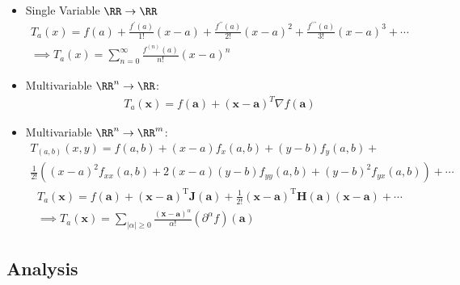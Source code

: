 \begin{itemize}
  \begin{itemize}
  \tightlist
  \item
    Single Variable \(\RR \to \RR\)
    \begin{align*}
      T_a(x) = f ( a ) + \frac { f ^ { \prime } ( a ) } { 1 ! } ( x - a ) + \frac { f ^ { \prime \prime } ( a ) } { 2 ! } ( x - a ) ^ { 2 } + \frac { f ^ { \prime \prime \prime } ( a ) } { 3 ! } ( x - a ) ^ { 3 } + \cdots \\ \implies T_a(x) = \sum _ { n = 0 } ^ { \infty } \frac { f ^ { ( n ) } ( a ) } { n ! } ( x - a ) ^ { n }
      \end{align*}
  \item
    Multivariable \(\RR^n \to \RR\):
    \begin{align*}
      T_a(\mathbf x) = f(\mathbf a) + (\mathbf x - \mathbf a)^T\nabla f(\mathbf a)
      \end{align*}
  \item
    Multivariable \(\RR^n \to \RR^m\):
    \begin{align*}
      T_{(a,b)} ( x , y ) = f ( a , b ) + ( x - a ) f _ { x } ( a , b ) + ( y - b ) f _ { y } ( a , b ) + \\ \frac { 1 } { 2 ! } \left( ( x - a ) ^ { 2 } f _ { x x } ( a , b ) + 2 ( x - a ) ( y - b ) f _ { y y  } ( a , b ) + ( y - b ) ^ { 2 } f _ { y x } ( a , b ) \right) + \cdots
      \end{align*}
    \begin{align*}
      T_a ( \mathbf { x } ) = f ( \mathbf { a } ) + ( \mathbf { x } - \mathbf { a } ) ^ { \mathrm { T } } \mathbf{J} ( \mathbf { a } ) + \frac { 1 } { 2 ! } ( \mathbf { x } - \mathbf { a } ) ^ { \mathrm { T } } \mathbf{H} ( \mathbf { a } ) ( \mathbf { x } - \mathbf { a } ) + \cdots \\
      \implies T_a ( \mathbf { x } ) = \sum _ { | \alpha | \geq 0 } \frac { ( \mathbf { x } - \mathbf { a } ) ^ { \alpha } } { \alpha ! } \left( \partial ^ { \alpha } f \right) ( \mathbf { a } )
      \end{align*}
  \end{itemize}
\end{itemize}

\hypertarget{analysis}{%
\subsection{Analysis}\label{analysis}}

